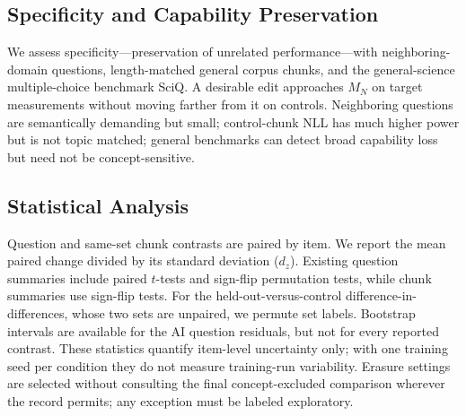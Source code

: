 \subsection{Specificity and Capability Preservation}

We assess specificity---preservation of unrelated performance---with
neighboring-domain questions, length-matched general corpus chunks, and the
general-science multiple-choice benchmark SciQ. A
desirable edit approaches $M_N$ on target measurements without moving farther
from it on controls. Neighboring questions are semantically demanding but
small; control-chunk NLL has much higher power but is not topic matched; general
benchmarks can detect broad capability loss but need not be concept-sensitive.

\subsection{Statistical Analysis}

Question and same-set chunk contrasts are paired by item. We report the mean
paired change divided by its standard deviation ($d_z$). Existing question
summaries include paired
$t$-tests and sign-flip permutation tests, while chunk summaries use sign-flip
tests. For the held-out-versus-control difference-in-differences, whose two
sets are unpaired, we permute set labels. Bootstrap intervals are available for
the AI question residuals, but not for every reported contrast. These
statistics quantify item-level uncertainty only; with one training seed per
condition they do not measure training-run variability. Erasure settings are
selected without consulting the final concept-excluded comparison wherever the
record permits; any exception must be labeled exploratory.
